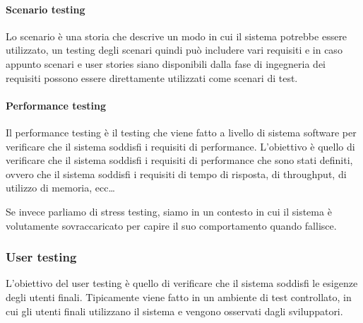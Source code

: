 \paragraph{Scenario testing}
Lo scenario è una storia che descrive un modo in cui il sistema potrebbe
essere utilizzato, un testing degli scenari quindi può includere vari requisiti
e in caso appunto scenari e user stories siano disponibili dalla fase di ingegneria
dei requisiti possono essere direttamente utilizzati come scenari di test.

\paragraph{Performance testing}
Il performance testing è il testing che viene fatto a livello di sistema software
per verificare che il sistema soddisfi i requisiti di performance.
L'obiettivo è quello di verificare che il sistema soddisfi i requisiti di performance
che sono stati definiti, ovvero che il sistema soddisfi i requisiti di tempo di
risposta, di throughput, di utilizzo di memoria, ecc\dots

Se invece parliamo di stress testing, siamo in un contesto in cui il sistema è
volutamente sovraccaricato per capire il suo comportamento quando fallisce.

\subsubsection{User testing}
L'obiettivo del user testing è quello di verificare che il sistema soddisfi le
esigenze degli utenti finali. Tipicamente viene fatto in un ambiente di test
controllato, in cui gli utenti finali utilizzano il sistema e vengono osservati
dagli sviluppatori.

